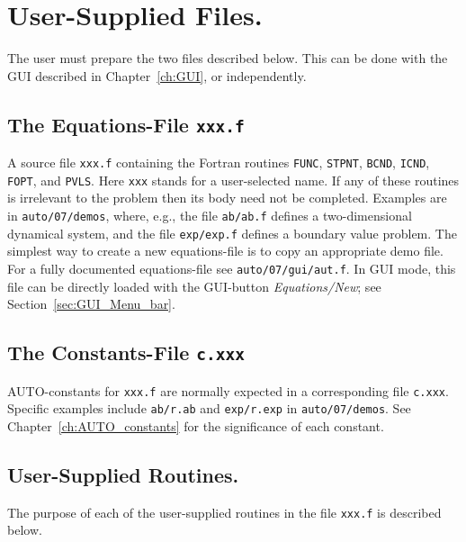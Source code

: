 \documentclass[12pt]{report}
\begin{document}
\chapter{ User-Supplied Files.} \label{ch:User_supplied_files}
The user must prepare the two files described below.
This can be done with the GUI described in Chapter~\ref{ch:GUI}, 
or independently.

\section{ The Equations-File {\tt xxx.f}} 
A source file {\tt xxx.f} containing the Fortran routines
{\tt FUNC}, {\tt STPNT}, {\tt BCND}, {\tt ICND}, {\tt FOPT}, and {\tt PVLS}.
Here {\tt xxx} stands for a user-selected name. 
If any of these routines is irrelevant 
to the problem then its body need not be completed.
Examples are in {\tt auto/07/demos}, where, e.g.,
the file {\tt ab/ab.f} defines a two-dimensional dynamical system,
and the file {\tt exp/exp.f} defines a boundary value problem.
The simplest way to create a new equations-file is to copy 
an appropriate demo file.
For a fully documented equations-file see {\tt auto/07/gui/aut.f}.
In GUI mode, this file can be directly loaded with the GUI-button 
{\it Equations/New}; see Section~\ref{sec:GUI_Menu_bar}.
 

\section{ The Constants-File {\tt c.xxx}} 
{\cal AUTO}-constants for {\tt xxx.f} are normally expected 
in a corresponding file {\tt c.xxx}.
Specific examples include {\tt ab/r.ab}
and {\tt exp/r.exp} in {\tt auto/07/demos}.
See Chapter~\ref{ch:AUTO_constants}
for the significance of each constant.

\newpage
\section{ User-Supplied Routines.} \label{sec: User_supplied_routines}
The purpose of each of the user-supplied routines in
the file {\tt xxx.f} is described below.
  
\end{document}
